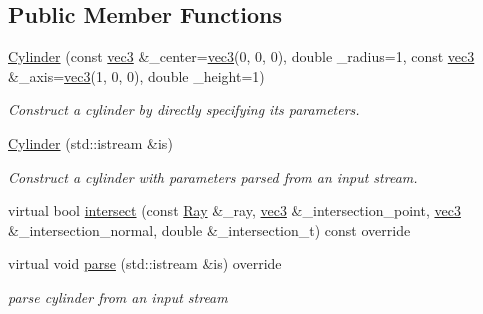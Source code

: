 \subsection*{Public Member Functions}
\begin{DoxyCompactItemize}
\item 
\hyperlink{classCylinder_acfd8665ca7813f66b02db296fa0a6fd3}{Cylinder} (const \hyperlink{classvec3}{vec3} \&\+\_\+center=\hyperlink{classvec3}{vec3}(0, 0, 0), double \+\_\+radius=1, const \hyperlink{classvec3}{vec3} \&\+\_\+axis=\hyperlink{classvec3}{vec3}(1, 0, 0), double \+\_\+height=1)
\begin{DoxyCompactList}\small\item\em Construct a cylinder by directly specifying its parameters. \end{DoxyCompactList}\item 
\hyperlink{classCylinder_a63a01bb5b2a520b0fb7521740a90c2a7}{Cylinder} (std\+::istream \&is)
\begin{DoxyCompactList}\small\item\em Construct a cylinder with parameters parsed from an input stream. \end{DoxyCompactList}\item 
virtual bool \hyperlink{classCylinder_a0ae732b1b669bbeb9eb83ee7395a5add}{intersect} (const \hyperlink{classRay}{Ray} \&\+\_\+ray, \hyperlink{classvec3}{vec3} \&\+\_\+intersection\+\_\+point, \hyperlink{classvec3}{vec3} \&\+\_\+intersection\+\_\+normal, double \&\+\_\+intersection\+\_\+t) const override
\item 
virtual void \hyperlink{classCylinder_a15050a6257a624cae1566a949b03b7da}{parse} (std\+::istream \&is) override
\begin{DoxyCompactList}\small\item\em parse cylinder from an input stream \end{DoxyCompactList}\end{DoxyCompactItemize}
